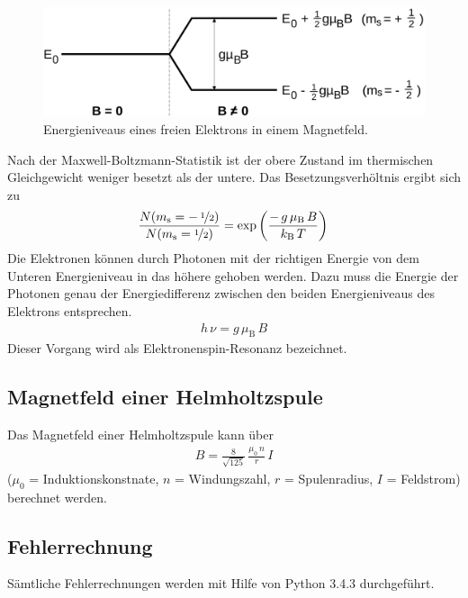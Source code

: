 \begin{figure}[H]
	\centering
	\includegraphics[width=\linewidth]{picture/EnergiequantelungElektron.pdf}
	\caption{Energieniveaus eines freien Elektrons in einem Magnetfeld. \cite{V28}}
	\label{fig:EnergiequantelungElektron}
\end{figure}

Nach der Maxwell-Boltzmann-Statistik ist der obere Zustand im thermischen Gleichgewicht weniger besetzt als der untere. Das Besetzungsverhöltnis ergibt sich zu
\begin{align}
	\frac{N(m_\text{s} = -\,\nicefrac{1}{2})}{N(m_\text{s} = \nicefrac{1}{2})} = \exp\left( \frac{-\,g\,\mu_\text{B}\,B}{k_\text{B}\,T} \right)
\end{align}
Die Elektronen können durch Photonen mit der richtigen Energie von dem Unteren Energieniveau in das höhere gehoben werden. Dazu muss die Energie der Photonen genau der Energiedifferenz zwischen den beiden Energieniveaus des Elektrons entsprechen.
\begin{align}
	h\,\nu = g\, \mu_\text{B}\, B
\end{align}
Dieser Vorgang wird als Elektronenspin-Resonanz bezeichnet.



\subsection{Magnetfeld einer Helmholtzspule}
Das Magnetfeld einer Helmholtzspule kann über
\begin{align}\label{eqn:BHelm} %
	B = \frac{8}{\sqrt{125}}\, \frac{\mu_0\, n}{r}\, I
\end{align}
\hfill \footnotesize{($\mu_0$ = Induktionskonstnate, $n$ = Windungszahl, $r$ = Spulenradius, $I$ = Feldstrom)} \hfill \vspace{0.25cm}\\
berechnet werden.


\newpage
\subsection{Fehlerrechnung}
Sämtliche Fehlerrechnungen werden mit Hilfe von Python 3.4.3 durchgeführt.

